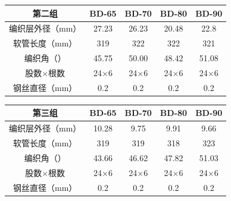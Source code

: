   \begin{table}[!htb]
  	\centering

  	\begin{tabular*}{0.8\textwidth}{@{\extracolsep{\fill}}>{\hspace{0.5cm}}ccccc}
  		\toprule
  		\textbf{第二组}          &     BD-65     &     BD-70     &     BD-80     &     BD-90     \\ \midrule
  		编织层外径（mm）  & 27.23      &     26.23     &     20.48     &     22.8        \\
  		软管长度（mm）    & 319       &      322      &      322      &      321        \\
  		编织角（\textdegree）& 45.75 &     50.00     &     48.42     &     51.08      \\
  		股数$ \times $根数        & 24$ \times $6 & 24$ \times $6 & 24$ \times $6 & 24$ \times $6 \\
  		钢丝直径（mm）              &      0.2      &      0.2      &      0.2      &      0.2      \\ \bottomrule
  	\end{tabular*} 
  \end{table}
  
  \begin{table}[!htb]
  	\centering
  	\begin{tabular*}{0.8\textwidth}{@{\extracolsep{\fill}}>{\hspace{0.5cm}}ccccc}
  		\toprule
  		\textbf{第三组}       &     BD-65     &     BD-70     &     BD-80     &     BD-90     \\ \midrule
  		编织层外径（mm）    &     10.28     &     9.75      &     9.91      &     9.66      \\
  		软管长度（mm）       &      319      &      319      &      318      &      323      \\
  		编织角（\textdegree） &     43.66     &     46.62     &     47.82     &     51.03     \\
  		股数$ \times $根数     & 24$ \times $6 & 24$ \times $6 & 24$ \times $6 & 24$ \times $6 \\
  		钢丝直径（mm）           &      0.2      &      0.2      &      0.2      &      0.2      \\ \bottomrule
  	\end{tabular*} 
  \end{table}  

